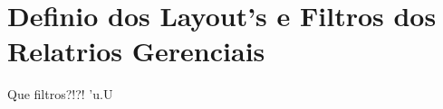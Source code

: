 \section{Defini\ca o dos Layout's e Filtros dos Relat\oh rios Gerenciais}

\label{pro:layout}

Que filtros?!?! 'u.U
